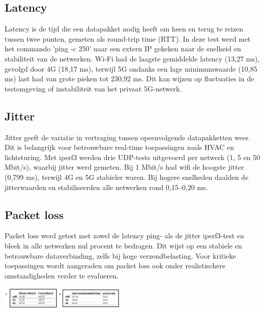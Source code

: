 \documentclass[a0,portrait]{hogent-poster}
\begin{document}
\begin{multicols}{2}
\begin{multicols}{2}
\subsection*{Latency}

Latency is de tijd die een datapakket nodig heeft om heen en terug te reizen tussen twee punten, gemeten als round-trip time (RTT). In deze test werd met het commando 'ping -c 250' naar een extern IP gekeken naar de snelheid en stabiliteit van de netwerken. Wi-Fi had de laagste gemiddelde latency (13,27 ms), gevolgd door 4G (18,17 ms), terwijl 5G ondanks een lage minimumwaarde (10,85 ms) last had van grote pieken tot 230,92 ms. Dit kan wijzen op fluctuaties in de testomgeving of instabiliteit van het privaat 5G-netwerk.
\subsection*{Jitter}

Jitter geeft de variatie in vertraging tussen opeenvolgende datapakketten weer. Dit is belangrijk voor betrouwbare real-time toepassingen zoals HVAC en lichtsturing. Met iperf3 werden drie UDP-tests uitgevoerd per netwerk (1, 5 en 50 Mbit/s), waarbij jitter werd gemeten. Bij 1 Mbit/s had wifi de hoogste jitter (0,799 ms), terwijl 4G en 5G stabieler waren. Bij hogere snelheden daalden de jitterwaarden en stabiliseerden alle netwerken rond 0,15–0,20 ms.
\end{multicols}

\subsection*{Packet loss}
Packet loss werd getest met zowel de latency ping- als de jitter iperf3-test en bleek in alle netwerken nul procent te bedragen. Dit wijst op een stabiele en betrouwbare dataverbinding, zelfs bij hoge verzendbelasting. Voor kritieke toepassingen wordt aangeraden om packet loss ook onder realistischere omstandigheden verder te evalueren.

\begin{center}
    \captionsetup{type=figure}
    \includegraphics[width=0.45\textwidth]{../graphics/bandbreedteLicht.png}
\end{center}


\end{multicols}
\end{document}
